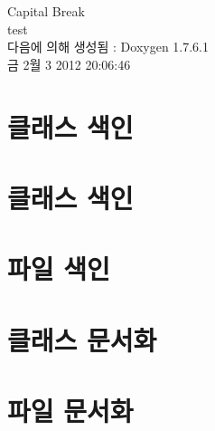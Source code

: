 \documentclass[a4paper]{book}
\begin{document}
\hypersetup{pageanchor=false,citecolor=blue}
\begin{titlepage}
\vspace*{7cm}
\begin{center}
{\Large \-Capital \-Break \\[1ex]\large test }\\
\vspace*{1cm}
{\large 다음에 의해 생성됨 \-:  Doxygen 1.7.6.1}\\
\vspace*{0.5cm}
{\small 금 2월 3 2012 20:06:46}\\
\end{center}
\end{titlepage}
\clearemptydoublepage
{}
\tableofcontents
\clearemptydoublepage
{}
\hypersetup{pageanchor=true,citecolor=blue}
\chapter{클래스 색인}

\chapter{클래스 색인}

\chapter{파일 색인}

\chapter{클래스 문서화}























\chapter{파일 문서화}








































\printindex
\end{document}
